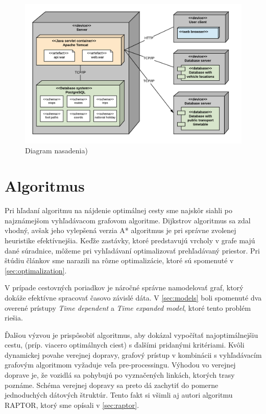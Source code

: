 \begin{figure}[H]
\centerline{\includegraphics[width=1.0\textwidth]{images/deployment-diagram}}
\caption[Diagram nasadenia]{Diagram nasadenia)}
\label{fig:deploymentDiagram}
\end{figure}

\section{Algoritmus}
Pri hľadaní algoritmu na nájdenie optimálnej cesty sme najskôr siahli po najznámejšom vyhľadávacom grafovom algoritme. Dijkstrov algoritmus sa zdal vhodný, avšak jeho vylepšená verzia A* algoritmus je pri správne zvolenej heuristike efektívnejšia. Keďže zastávky, ktoré predstavujú vrcholy v grafe majú dané súradnice, môžeme pri vyhľadávaní optimalizovať prehľadávaný priestor. Pri štúdiu článkov sme narazili na rôzne optimalizácie, ktoré sú spomenuté v \ref{sec:optimalization}.

V prípade cestovných poriadkov je náročné správne namodelovať graf, ktorý dokáže efektívne spracovať časovo závislé dáta. V \ref{sec:models} boli spomenuté dva overené prístupy \textit{Time dependent} a \textit{Time expanded model}, ktoré tento problém riešia. 

Ďalšou výzvou je prispôsobiť algoritmus, aby dokázal vypočítať najoptimálnejšiu cestu, (príp. viacero optimálnych ciest) s ďalšími pridanými kritériami. Kvôli dynamickej povahe verejnej dopravy, grafový prístup v kombinácii s vyhľadávacím grafovým algoritmom vyžaduje veľa pre-processingu. Výhodou vo verejnej doprave je, že vozidlá sa pohybujú po vyznačených linkách, ktorých trasy poznáme. Schéma verejnej dopravy sa preto dá zachytiť do pomerne jednoduchých dátových štruktúr. Tento fakt si všimli aj autori algoritmu RAPTOR, ktorý sme opísali v \ref{sec:raptor}. 


